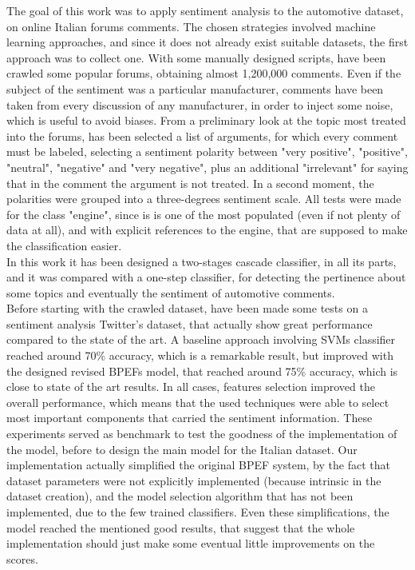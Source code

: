 The goal of this work was to apply sentiment analysis to the automotive dataset, on online Italian forums comments. The chosen strategies involved machine learning approaches, and since it does not already exist suitable datasets, the first approach was to collect one. With some manually designed scripts, have been crawled some popular forums, obtaining almost 1,200,000 comments. Even if the subject of the sentiment was a particular manufacturer, comments have been taken from every discussion of any manufacturer, in order to inject some noise, which is useful to avoid biases. From a preliminary look at the topic most treated into the forums, has been selected a list of arguments, for which every comment must be labeled, selecting a sentiment polarity between "very positive", "positive", "neutral", "negative" and "very negative", plus an additional "irrelevant" for saying that in the comment the argument is not treated. In a second moment, the polarities were grouped into a three-degrees sentiment scale. All tests were made for the class "engine", since is is one of the most populated (even if not plenty of data at all), and with explicit references to the engine, that are supposed to make the classification easier.\\
In this work it has been designed a two-stages cascade classifier, in all its parts, and it was compared with a one-step classifier, for detecting the pertinence about some topics and eventually the sentiment of automotive comments.\\
Before starting with the crawled dataset, have been made some tests on a sentiment analysis Twitter's dataset, that actually show great performance compared to the state of the art. A baseline approach involving \aclp{SVM} classifier reached around 70\% accuracy, which is a remarkable result, but improved with the designed revised \aclp{BPEF} model, that reached around 75\% accuracy, which is close to state of the art results. In all cases, features selection improved the overall performance, which means that the used techniques were able to select most important components that carried the sentiment information. These experiments served as benchmark to test the goodness of the implementation of the model, before to design the main model for the Italian dataset. Our implementation actually simplified the original \ac{BPEF} system, by the fact that dataset parameters were not explicitly implemented (because intrinsic in the dataset creation), and the model selection algorithm that has not been implemented, due to the few trained classifiers. Even these simplifications, the model reached the mentioned good results, that suggest that the whole implementation should just make some eventual little improvements on the scores.\\
